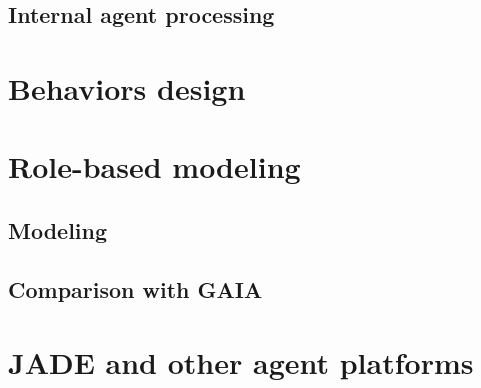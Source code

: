 \documentclass[a4paper,11pt]{report}
\begin{document}
  
  \subsection{Internal agent processing}


  
  
  \section{Behaviors design} %
  

  
  
  \clearpage %
  
  \section{Role-based modeling} %
  
  \subsection{Modeling}
  
  \subsection{Comparison with GAIA}

  
  
  
  \section{JADE and other agent platforms} %
  
  
\end{document}
